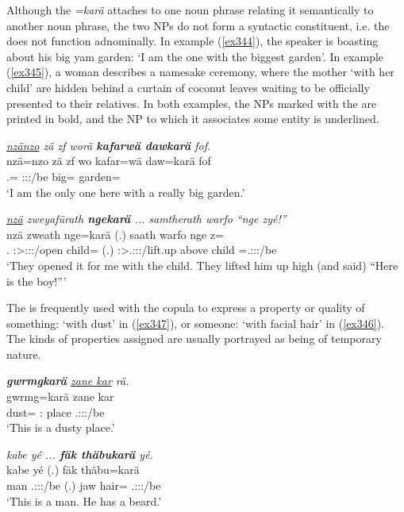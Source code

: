 Although the  \emph{=karä} attaches to one noun phrase relating it semantically to another noun phrase, the two NPs do not form a syntactic constituent, i.e. the  does not function adnominally. In example (\ref{ex344}), the speaker is boasting about his big yam garden: `I am the one with the biggest garden'. In example (\ref{ex345}), a woman describes a namesake ceremony, where the mother `with her child' are hidden behind a curtain of coconut leaves waiting to be officially presented to their relatives. In both examples, the NPs marked with the  are printed in bold, and the NP to which it associates some entity is underlined.

\begin{exe}
	\ex \emph{\underline{nzänzo} zä zf worä \textbf{kafarwä dawkarä} fof.}\\
	\gll nzä=nzo zä zf wo kafar=wä daw=karä fof\\
	\Fsg.{\Abs}={\Only} {\Prox} {\Imm} \Fsg:\Sbj:\Nonpast:\Ipfv/be big={\Emph} garden={\Prop} {\Emph}\\  
	\trans `I am the only one here with a really big garden.'
	\label{ex344}
\end{exe}
\begin{exe}
	\ex \emph{\underline{nzä} zweyafürath \textbf{ngekarä}  ... samtherath warfo ``nge zyé!''}\\
	\gll nzä zweath nge=karä (.) saath warfo nge z=\\
	\Fsg.{\Abs} \Stpl:\Sbj>\Fsg:\Io:\Pst:\Pfv/open child={\Prop} (.) \Stpl:\Sbj>\Tsg.\Masc:\Obj:\Pst:\Pfv/lift.up above child \Prox=\Tsg.\Masc:\Sbj:\Nonpast:\Ipfv/be\\
	\trans `They opened it for me with the child. They lifted him up high (and said) ``Here is the boy!'''
	\label{ex345}
\end{exe}
	
The  is frequently used with the copula to express a property or quality of something: `with dust' in (\ref{ex347}), or someone: `with facial hair' in (\ref{ex346}). The kinds of properties assigned are usually portrayed as being of temporary nature.

\begin{exe}
	\ex \emph{\textbf{gwrmgkarä} \underline{zane kar} rä.}\\
	\gll gwrmg=karä zane kar \\
	dust={\Prop} \Dem:{\Prox} place \Tsg.\F:\Sbj:\Nonpast:\Ipfv/be\\
	\trans `This is a dusty place.'
	\label{ex347}
\end{exe}
\begin{exe}
	\ex \emph{kabe yé ... \textbf{fäk thäbukarä} yé.}\\
	\gll kabe yé (.) fäk thäbu=karä \\
	man \Tsg.\Masc:\Sbj:\Nonpast:\Ipfv/be (.) jaw hair={\Prop} \Tsg.\Masc:\Sbj:\Nonpast:\Ipfv/be\\
	\trans `This is a man. He has a beard.'
	\label{ex346}
\end{exe}

